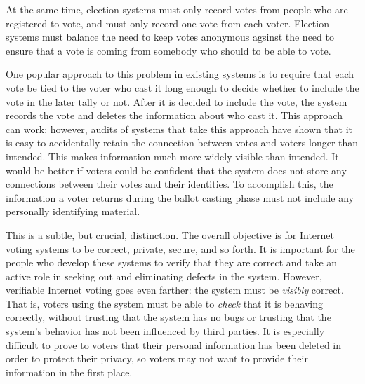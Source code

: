 At the same time, election systems must only record votes from people
who are registered to vote, and must only record one vote from each
voter. Election systems must balance the need to keep votes anonymous
agsinst the need to ensure that a vote is coming from somebody who
should to be able to vote.

One popular approach to this problem in existing systems is to require
that each vote be tied to the voter who cast it long enough to decide
whether to include the vote in the later tally or not. After it is
decided to include the vote, the system records the vote and deletes
the information about who cast it. This approach can work; however,
audits of systems that take this approach have shown that it is easy
to accidentally retain the connection between votes and voters longer
than intended. This makes information much more widely visible than
intended. It would be better if voters could be confident that the
system does not store any connections between their votes and their
identities. To accomplish this, the information a voter returns during
the ballot casting phase must not include any personally identifying
material.

This is a subtle, but crucial, distinction. The overall objective is
for Internet voting systems to be correct, private, secure, and so
forth. It is important for the people who develop these systems to
verify that they are correct and take an active role in seeking out
and eliminating defects in the system. However, verifiable Internet
voting goes even farther: the system must be \emph{visibly}
correct. That is, voters using the system must be able to \emph{check}
that it is behaving correctly, without trusting that the system has no
bugs or trusting that the system's behavior has not been influenced by
third parties. It is especially difficult to prove to voters that
their personal information has been deleted in order to protect their
privacy, so voters may not want to provide their information in the
first place.

